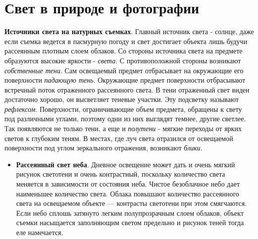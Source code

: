 \documentclass{article}
\begin{document}
\section{Свет в природе и фотографии}
\textbf{Источники света на натурных съемках}. Главный источник света - солнце, даже если съемка ведется в пасмурную погоду и свет достигает объекта лишь будучи рассеянным плотным слоем облаков. Со стороны источника света на предмете образуются высокие яркости - \textit{света}. С противоположной стороны возникают \textit{собственные тени}. Сам освещаемый предмет отбрасывает на окружающие его поверхности \textit{падающую тень}. Окружающие предмет поверхности отбрасывают встречный поток отраженного рассеянного света. В тени отраженный свет виден достаточно хорошо, он высветляет теневые участки. Эту подсветку называют \textit{рефлексом}. Поверхности, ограничивающие объем предмета, обращены к свету под различными углами, поэтому одни из них выглядят темнее, другие светлее. Так появляются не только тени, а еще и \textit{полутени} - мягкие переходы от ярких светов к глубоким теням. В местах, где луч света отразился от освещаемой поверхности под углом зеркального отражения, возникают \textit{блики}.
\begin{itemize}
\item \textbf{Рассеянный свет неба}. Дневное освещение может дать и очень мягкий рисунок светотени и очень контрастный, поскольку количество света меняется в зависимости от состояния неба. Чистое безоблачное небо дает наименьшее количество света. Облака повышают количество рассеянного света на освещаемом объекте --- контрасты светотени при этом смягчаются. Если небо сплошь затянуто легким полупрозрачным слоем облаков, объект съемки насыщается заполняющим светом предельно и рисунок теней тогда еле намечается.
\end{itemize}
\end{document}
